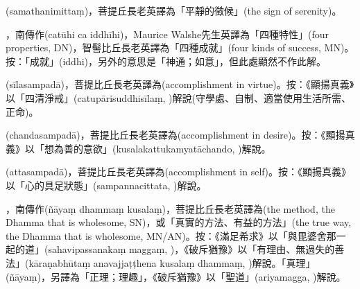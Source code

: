 \startitemgroup[noteitems]
\item{}(samathanimittaṃ)，菩提丘長老英譯為「平靜的徵候」(the sign of serenity)。
\stopitemgroup

\startitemgroup[noteitems]
\item{}，南傳作(catūhi ca iddhīhi)，Maurice Walshe先生英譯為「四種特性」(four properties, DN)，智髻比丘長老英譯為「四種成就」(four kinds of success, MN)。按：「成就」(iddhi)，另外的意思是「神通；如意」，但此處顯然不作此解。
\stopitemgroup

\startitemgroup[noteitems]
\item{}(sīlasampadā)，菩提比丘長老英譯為(accomplishment in virtue)。按：《顯揚真義》以「四清淨戒」(catupārisuddhisīlaṃ, )解說(守學處、自制、適當使用生活所需、正命)。
\item{}(chandasampadā)，菩提比丘長老英譯為(accomplishment in desire)。按：《顯揚真義》以「想為善的意欲」(kusalakattukamyatāchando, )解說。
\item{}(attasampadā)，菩提比丘長老英譯為(accomplishment in self)。按：《顯揚真義》以「心的具足狀態」(sampannacittata, )解說。
\stopitemgroup

\startitemgroup[noteitems]
\item{}，南傳作(ñāyaṃ dhammaṃ kusalaṃ)，菩提比丘長老英譯為(the method, the Dhamma that is wholesome, SN)，或「真實的方法、有益的方法」(the true way, the Dhamma that is wholesome, MN/AN)。按：《滿足希求》以「與毘婆舍那一起的道」(sahavipassanakaṃ maggaṃ, )，《破斥猶豫》以「有理由、無過失的善法」(kāraṇabhūtaṃ anavajjaṭṭhena kusalaṃ dhammaṃ, )解說。「真理」(ñāyaṃ)，另譯為「正理；理趣」，《破斥猶豫》以「聖道」(ariyamagga, )解說。
\stopitemgroup

